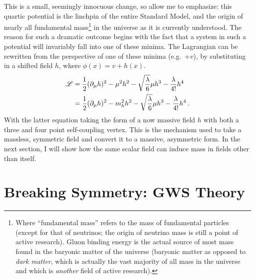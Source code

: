    This is a small, seemingly innocuous change, so allow me to emphasize:
        this quartic potential is the linchpin of the entire Standard Model,
        and the origin of nearly all fundamental mass\footnote{
            Where ``fundamental mass'' refers to the mass of fundamental particles
                (except for that of neutrinos; the origin of neutrino mass is still a point of active research).
            Gluon binding energy is the actual source of most mass found in the baryonic matter of the universe
                (baryonic matter as opposed to \textit{dark matter},
                which is actually the vast majority of all mass in the universe
                and which is \textit{another} field of active research).
        } in the universe as it is currently understood.
    The reason for such a dramatic outcome begins with the fact that
        a system in such a potential will invariably fall into one of these minima.
    The Lagrangian can be rewritten from the perspective of one of these minima (e.g.\ $+v$),
        by substituting in a shifted field $h$, where $\phi(x)=v+h(x)$.
    \begin{equation} \begin{split} \label{eq:basic_higgs}
        \mathscr{L} & = \frac{1}{2} (\partial_{\mu} h)^2
            - \mu^2 h^2
            -\sqrt{\frac{\lambda}{6}} \mu h^3
            - \frac{\lambda}{4!} h^4 \\
         & = \frac{1}{2} (\partial_{\mu} h)^2
            - m^2_{h} h^2
            -\sqrt{\frac{\lambda}{6}} \mu h^3
            - \frac{\lambda}{4!} h^4
        \,.
    \end{split} \end{equation} %
    With the latter equation taking the form of a now massive field $h$ with both a three and four point self-coupling vertex.
    This is the mechanism used to take a massless, symmetric field and convert it to a massive, asymmetric form.
    In the next section, I will show how the same scalar field can induce mass in fields other than itself.



\section{Breaking Symmetry: GWS Theory}

